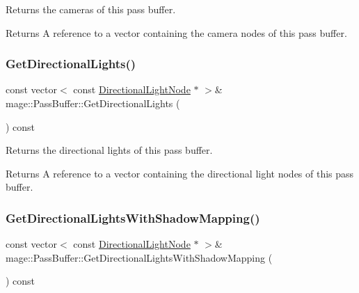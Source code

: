 Returns the cameras of this pass buffer.

\begin{DoxyReturn}{Returns}
A reference to a vector containing the camera nodes of this pass buffer. 
\end{DoxyReturn}
\hypertarget{structmage_1_1_pass_buffer_a23f032aeb9541e26997fb7009473ae3d}{}\label{structmage_1_1_pass_buffer_a23f032aeb9541e26997fb7009473ae3d} 
\subsubsection{\texorpdfstring{Get\+Directional\+Lights()}{GetDirectionalLights()}}
{\footnotesize\ttfamily const vector$<$ const \hyperlink{namespacemage_a7637b5351fc0f66a10badd80ebb35899}{Directional\+Light\+Node} $\ast$ $>$\& mage\+::\+Pass\+Buffer\+::\+Get\+Directional\+Lights (\begin{DoxyParamCaption}{ }\end{DoxyParamCaption}) const\hspace{0.3cm}{\ttfamily [noexcept]}}

Returns the directional lights of this pass buffer.

\begin{DoxyReturn}{Returns}
A reference to a vector containing the directional light nodes of this pass buffer. 
\end{DoxyReturn}
\hypertarget{structmage_1_1_pass_buffer_aaa5990e167c1f729f7c83bc4b12848cb}{}\label{structmage_1_1_pass_buffer_aaa5990e167c1f729f7c83bc4b12848cb} 
\subsubsection{\texorpdfstring{Get\+Directional\+Lights\+With\+Shadow\+Mapping()}{GetDirectionalLightsWithShadowMapping()}}
{\footnotesize\ttfamily const vector$<$ const \hyperlink{namespacemage_a7637b5351fc0f66a10badd80ebb35899}{Directional\+Light\+Node} $\ast$ $>$\& mage\+::\+Pass\+Buffer\+::\+Get\+Directional\+Lights\+With\+Shadow\+Mapping (\begin{DoxyParamCaption}{ }\end{DoxyParamCaption}) const\hspace{0.3cm}{\ttfamily [noexcept]}}

